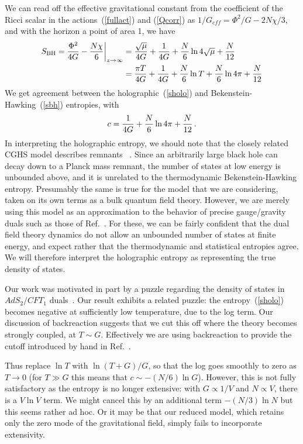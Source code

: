 \documentclass[12pt]{article}
\begin{document}
{ {We can read off the effective gravitational constant from the coefficient of the Ricci scalar in the actions~(\ref{fullact}) and (\ref{Qcorr}) as $1/G_{eff} = {\Phi^2 / G} - {2 N \chi / 3}$, and with the horizon a point of area 1, we have
\begin{align}
S_{\rm BH} = {\Phi^2 \over 4 G} - {N \chi\over 6} \biggr|_{z \to \infty} &= {\sqrt{\mu} \over 4 G} + {1 \over 4 G} + {N\over6}\ln{4 \sqrt{\mu}} + {N \over 12} \nonumber \\
&= {\pi T \over 4 G} + {1 \over 4 G} + {N\over6}\ln{T} + {N \over 6}\ln{4 \pi} +  {N \over 12}  \label{sbh}
\end{align}We get agreement between the holographic~(\ref{sholo}) and Bekenstein-Hawking~(\ref{sbh}) entropies, with 
\begin{align}
c =  {1 \over 4 G}+ {N \over 6}\ln{4 \pi} +  {N \over 12} \,.
\end{align}}
In interpreting the holographic entropy, we should note that the closely related CGHS model describes remnants~\cite{Banks:1992ba,Giddings:1992ff,Almheiri:2013wka} .  Since an arbitrarily large black hole can decay down to a Planck mass remnant, the number of states at low energy is unbounded above, and it is unrelated to the thermodynamic Bekenstein-Hawking entropy.  Presumably the same is true for the model that we are considering, taken on its own terms as a bulk quantum field theory.  However, we are merely using this model as an approximation to the behavior of precise gauge/gravity duals such as those of Ref.~\cite{Almheiri:2011cb}.  For these, we can be fairly confident that the dual field theory dynamics do not allow an unbounded number of states at finite energy, and expect rather that the thermodynamic and statistical entropies agree.  We will therefore interpret the holographic entropy as representing the true density of states.

Our work was motivated in part by a puzzle regarding the density of states in $AdS_2/CFT_1$ duals~\cite{Jensen:2011su,Iqbal:2011in}.  Our result exhibits a related puzzle: the entropy~(\ref{sholo}) becomes negative at sufficiently low temperature, due to the log term.  Our discussion of backreaction suggests that we cut this off where the theory becomes strongly coupled, at $T \sim G$.  Effectively we are using backreaction to provide the cutoff introduced by hand in Ref.~\cite{Iqbal:2011in}.

Thus replace $\ln T$ with $\ln (T+G)/G$, so that the log goes smoothly to zero as $T \to 0$ (for $T \gg G$ this means that 
 $c \sim - (N/6) \ln G $).  However, this is not fully satisfactory as the entropy is no longer extensive: with $G\propto 1/V$ and $N \propto V$, there is a $V \ln V$ term.  We might cancel this by an additional term $- (N/3) \ln N$ but this seems rather ad hoc.  Or it may be that our reduced model, which retains only the zero mode of the gravitational field, simply fails to incorporate extensivity.
 
}
\end{document}
